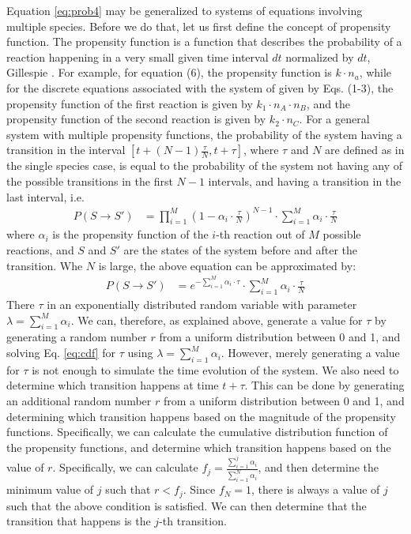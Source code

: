 \documentclass[12pt]{article}
\begin{document}
Equation \ref{eq:prob4} may be generalized to systems of equations involving multiple species. Before we do that, let us first define the concept of propensity function. The propensity function is a function that describes the probability of a reaction happening in a very small given time interval $dt$ normalized by $dt$, Gillespie \cite{Gillespie2007}. For example, for equation (6), the propensity function is $k \cdot n_a$, while for the discrete equations associated with the system of  given by Eqs. (1-3), the propensity function of the first reaction is given by $k_1 \cdot n_A \cdot n_B$, and the propensity function of the second reaction is given by $k_2 \cdot n_C$.  For a general system with multiple propensity functions, the probability of the system having a transition in the interval $[t+(N-1)\frac \tau N,t+\tau]$, where $\tau$ and $N$ are defined as in the single species case, is equal to the probability of the system not having any of the possible transitions in the first $N-1$ intervals, and having a transition in the last interval, i.e.
\begin{align}
P(S \rightarrow S') &= \prod_{i=1}^{M} (1-\alpha_i \cdot \frac \tau N)^{N-1} \cdot \sum_{i=1}^{M}\alpha_i \cdot \frac \tau N
\label{eq:prob5}
\end{align}
where $\alpha_i$ is the propensity function of the $i$-th reaction out of $M$ possible reactions, and $S$ and $S'$ are the states of the system before and after the transition.  Whe $N$ is large, the above equation can be approximated by:
\begin{align}
P(S \rightarrow S') &= e^{-\sum_{i=1}^{M}\alpha_i \cdot \tau} \cdot \sum_{i=1}^{M}\alpha_i \cdot \frac \tau N
\label{eq:prob6}
\end{align}
There $\tau$ in an exponentially distributed random variable with parameter $\lambda = \sum_{i=1}^{M}\alpha_i$.  We can, therefore, as explained above, generate a value for $\tau$ by generating a random number $r$ from a uniform distribution between 0 and 1, and solving Eq. \ref{eq:cdf} for $\tau$ using $\lambda=\sum_{i=1}^{M}\alpha_i$. However, merely generating a value for $\tau$ is not enough to simulate the time evolution of the system. We also need to determine which transition happens at time $t+\tau$. This can be done by generating an additional random number $r$ from a uniform distribution between 0 and 1, and determining which transition happens based on the magnitude of the propensity functions.  Specifically, we can calculate the cumulative distribution function of the propensity functions, and determine which transition happens based on the value of $r$.  Specifically, we can calculate $f_j=\frac {\sum_{i=1}^{j}\alpha_i} {\sum_{i=1}^N \alpha_i}$, and then determine the minimum value of $j$ such that $r<f_j$. Since $f_N=1$, there is always a value of $j$ such that the above condition is satisfied.  We can then determine that the transition that happens is the $j$-th transition. 
\end{document}
